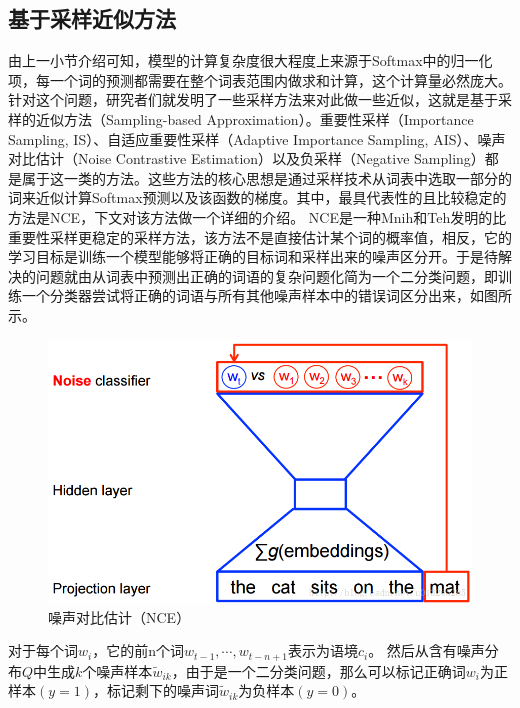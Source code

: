 \documentclass[12pt,a4paper]{article}
\begin{document}
\subsection{基于采样近似方法}
由上一小节介绍可知，模型的计算复杂度很大程度上来源于Softmax中的归一化项，每一个词的预测都需要在整个词表范围内做求和计算，这个计算量必然庞大。针对这个问题，研究者们就发明了一些采样方法来对此做一些近似，这就是基于采样的近似方法（Sampling-based Approximation）。重要性采样（Importance Sampling, IS）\cite{DBLP:conf/aistats/BengioS03}、自适应重要性采样（Adaptive Importance Sampling, AIS）\cite{DBLP:journals/tnn/BengioS08}、噪声对比估计（Noise Contrastive Estimation）\cite{DBLP:journals/jmlr/GutmannH12,DBLP:conf/icml/MnihT12}以及负采样（Negative Sampling）\cite{DBLP:journals/corr/abs-1301-3781}都是属于这一类的方法。这些方法的核心思想是通过采样技术从词表中选取一部分的词来近似计算Softmax预测以及该函数的梯度。其中，最具代表性的且比较稳定的方法是NCE，下文对该方法做一个详细的介绍。
NCE是一种Mnih和Teh发明的比重要性采样更稳定的采样方法，该方法不是直接估计某个词的概率值，相反，它的学习目标是训练一个模型能够将正确的目标词和采样出来的噪声区分开。于是待解决的问题就由从词表中预测出正确的词语的复杂问题化简为一个二分类问题，即训练一个分类器尝试将正确的词语与所有其他噪声样本中的错误词区分出来，如图所示。
\begin{figure}
  \centering
  \includegraphics[width=0.6\linewidth]{./figures/nce.png}
  \caption{噪声对比估计（NCE）}\label{fig:nce}
\end{figure}

对于每个词${w_i}$，它的前n个词${w_{t-1},\cdots,w_{t-n+1}}$表示为语境${c_i}$。 然后从含有噪声分布$Q$中生成$k$个噪声样本${\tilde{w}_{ik}}$，由于是一个二分类问题，那么可以标记正确词$w_i$为正样本${(y=1)}$，标记剩下的噪声词${\tilde{w}_{ik}}$为负样本${(y=0)}$。
\end{document}
